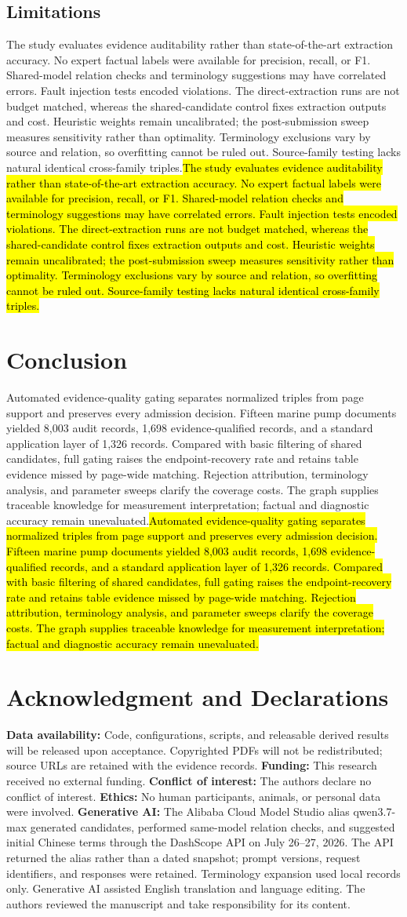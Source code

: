 \documentclass[conference,a4paper]{IEEEtran}
\DeclareRobustCommand{\rev}[1]{\ifdefined\CleanVersion#1\else\hl{#1}\fi}
\begin{document}
\subsection{Limitations}

\rev{The study evaluates evidence auditability rather than state-of-the-art extraction accuracy. No expert factual labels were available for precision, recall, or F1. Shared-model relation checks and terminology suggestions may have correlated errors. Fault injection tests encoded violations. The direct-extraction runs are not budget matched, whereas the shared-candidate control fixes extraction outputs and cost. Heuristic weights remain uncalibrated; the post-submission sweep measures sensitivity rather than optimality. Terminology exclusions vary by source and relation, so overfitting cannot be ruled out. Source-family testing lacks natural identical cross-family triples.}

\section{Conclusion}

\rev{Automated evidence-quality gating separates normalized triples from page support and preserves every admission decision. Fifteen marine pump documents yielded 8,003 audit records, 1,698 evidence-qualified records, and a standard application layer of 1,326 records. Compared with basic filtering of shared candidates, full gating raises the endpoint-recovery rate and retains table evidence missed by page-wide matching. Rejection attribution, terminology analysis, and parameter sweeps clarify the coverage costs. The graph supplies traceable knowledge for measurement interpretation; factual and diagnostic accuracy remain unevaluated.}

\section*{Acknowledgment and Declarations}

\textbf{Data availability:} Code, configurations, scripts, and releasable derived results will be released upon acceptance. Copyrighted PDFs will not be redistributed; source URLs are retained with the evidence records. \textbf{Funding:} This research received no external funding. \textbf{Conflict of interest:} The authors declare no conflict of interest. \textbf{Ethics:} No human participants, animals, or personal data were involved. \textbf{Generative AI:} The Alibaba Cloud Model Studio alias \mbox{qwen3.7-max} generated candidates, performed same-model relation checks, and suggested initial Chinese terms through the DashScope API on July 26--27, 2026. The API returned the alias rather than a dated snapshot; prompt versions, request identifiers, and responses were retained. Terminology expansion used local records only. Generative AI assisted English translation and language editing. The authors reviewed the manuscript and take responsibility for its content.

\balance



\ifdefined\IncludeResponse
  \clearpage
  \nobalance
  \onecolumn
  
\fi
\end{document}
